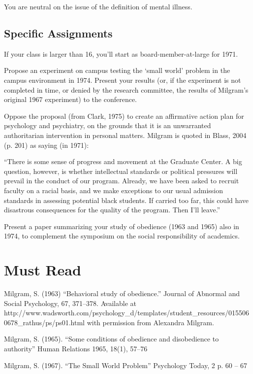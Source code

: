 You are neutral on the issue of the definition of mental illness.

\subsection{Specific Assignments}
\label{specificassignments}

If your class is larger than 16, you'll start as board-member-at-large for 1971.

Propose an experiment on campus testing the `small world' problem in the campus environment in 1974. Present your results (or, if the experiment is not completed in time, or denied by the research committee, the results of Milgram's original 1967 experiment) to the conference.

Oppose the proposal (from Clark, 1975) to create an affirmative action plan for psychology and psychiatry, on the grounds that it is an unwarranted authoritarian intervention in personal matters. Milgram is quoted in Blass, 2004 (p. 201) as saying (in 1971):

``There is some sense of progress and movement at the Graduate Center. A big question, however, is whether intellectual standards or political pressures will prevail in the conduct of our program. Already, we have been asked to recruit faculty on a racial basis, and we make exceptions to our usual admission standards in assessing potential black students. If carried too far, this could have disastrous consequences for the quality of the program. Then I'll leave.''

Present a paper summarizing your study of obedience (1963 and 1965) also in 1974, to complement the symposium on the social responsibility of academics.

\section{Must Read}
\label{mustread}

Milgram, S. (1963) ``Behavioral study of obedience.'' Journal of Abnormal and Social Psychology, 67, 371–378. Available at http:\slash \slash www.wadsworth.com\slash psychology\_d\slash templates\slash student\_resources\slash 0155060678\_rathus\slash ps\slash ps01.html with permission from Alexandra Milgram.

Milgram, S. (1965). ``Some conditions of obedience and disobedience to authority'' Human Relations 1965, 18(1), 57--76

Milgram, S. (1967). ``The Small World Problem'' Psychology Today, 2 p. 60 – 67

